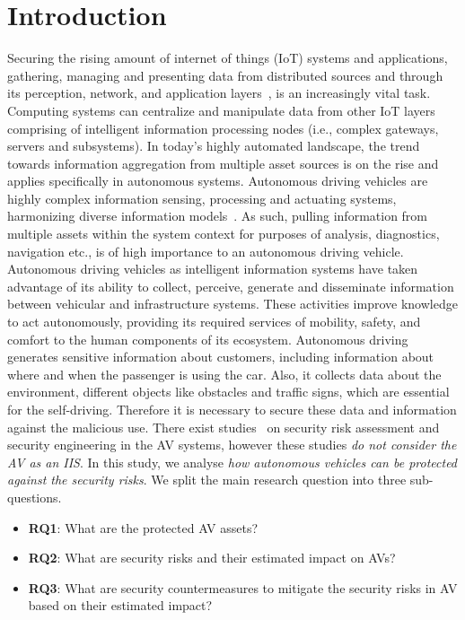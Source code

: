 \documentclass[runningheads]{llncs}
\begin{document}
\section{Introduction}
Securing the rising amount of internet of things (IoT) systems and applications, gathering, managing and presenting data from distributed sources and through its perception, network, and application layers~\cite{AffiaEtAl2019}, is an increasingly vital task. 
%
Computing systems can centralize and manipulate data from other IoT layers comprising of intelligent information processing nodes (i.e., complex gateways, servers and subsystems).
In today’s highly automated landscape, the trend towards information aggregation from multiple asset sources is on the rise and applies specifically in autonomous systems.
%
Autonomous driving vehicles are highly complex information sensing, processing and actuating systems, harmonizing diverse information models~\cite{banerjee2017aggregation}. As such, pulling information from multiple assets within the system context for purposes of analysis, diagnostics, navigation etc., is of high importance to an autonomous driving vehicle.
%
Autonomous driving vehicles as intelligent information systems have taken advantage of its ability to collect, perceive, generate and disseminate information between vehicular and infrastructure systems. These activities improve knowledge to act autonomously, providing its required services of mobility, safety, and comfort to the human components of its ecosystem.  
%
Autonomous driving generates sensitive information about customers, including information about where and when the passenger is using the car. Also, it collects data about the environment, different objects like obstacles and traffic signs, which are essential for the self-driving. Therefore it is necessary to secure these data and information against the malicious use. There exist studies~\cite{Bailey2018,ElRewiniEtAl2020} on security risk assessment and security engineering in the AV systems, however these studies \textit{do not consider the AV as an IIS}. 
In this study, we analyse \textit{how autonomous vehicles can be protected against the security risks}. We split the main research question into three sub-questions. 

\begin{itemize}
\item \textbf{RQ1}: What are the protected AV assets?
\item \textbf{RQ2}: What are security risks and their estimated impact on AVs? 
\item \textbf{RQ3}: What are security countermeasures to mitigate the security risks in AV based on their estimated impact?
\end{itemize}
\end{document}
